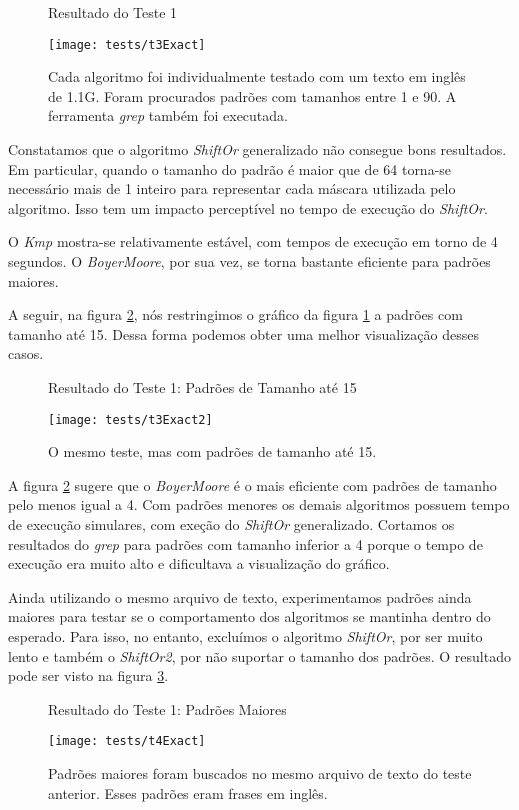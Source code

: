 \documentclass[]{article}
\newcommand{\figref}[1]{figura \ref{#1}}
\begin{document}
\begin{figure}[h]
	{\centering Resultado do Teste 1\par}
	\texttt{[image: tests/t3Exact]}
\caption{Cada algoritmo foi individualmente testado com um texto em inglês de 1.1G. Foram procurados padrões com tamanhos entre 1 e 90. A ferramenta \textit{grep} também foi executada.}
\label{fig:e2}
\end{figure}

Constatamos que o algoritmo \textit{ShiftOr} generalizado não consegue bons resultados. Em particular, quando o tamanho do padrão é maior que de 64 torna-se necessário mais de 1 inteiro para representar cada máscara utilizada pelo algoritmo. Isso tem um impacto perceptível no tempo de execução do \textit{ShiftOr}. 

O \textit{Kmp} mostra-se relativamente estável, com tempos de execução em torno de 4 segundos. O \textit{BoyerMoore}, por sua vez, se torna bastante eficiente para padrões maiores. 

A seguir, na \figref{fig:e3}, nós restringimos o gráfico da \figref{fig:e2} a padrões com tamanho até 15. Dessa forma podemos obter uma melhor visualização desses casos.

\begin{figure}[h]
	{\centering Resultado do Teste 1: Padrões de Tamanho até 15\par}
	\texttt{[image: tests/t3Exact2]}
\caption{O mesmo teste, mas com padrões de tamanho até 15.}
\label{fig:e3}
\end{figure}

A \figref{fig:e3} sugere que o \textit{BoyerMoore} é o mais eficiente com padrões de tamanho pelo menos igual a 4. Com padrões menores os demais algoritmos possuem tempo de execução simulares, com exeção do \textit{ShiftOr} generalizado. Cortamos os resultados do \textit{grep} para padrões com tamanho inferior a 4 porque o tempo de execução era muito alto e dificultava a visualização do gráfico.

Ainda utilizando o mesmo arquivo de texto, experimentamos padrões ainda maiores para testar se o comportamento dos algoritmos se mantinha dentro do esperado. Para isso, no entanto, excluímos o algoritmo \textit{ShiftOr}, por ser muito lento e também o \textit{ShiftOr2}, por não suportar o tamanho dos padrões. O resultado pode ser visto na \figref{fig:e4}.

\begin{figure}[h]
	{\centering Resultado do Teste 1: Padrões Maiores\par}
	\texttt{[image: tests/t4Exact]}
\caption{Padrões maiores foram buscados no mesmo arquivo de texto do teste anterior. Esses padrões eram frases em inglês.}
\label{fig:e4}
\end{figure}
\end{document}
